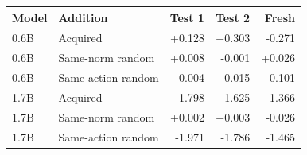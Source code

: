 \begin{tabular}{llrrr}\toprule
Model & Addition & Test 1 & Test 2 & Fresh\\\midrule
0.6B & Acquired & +0.128 & +0.303 & -0.271\\
0.6B & Same-norm random & +0.008 & -0.001 & +0.026\\
0.6B & Same-action random & -0.004 & -0.015 & -0.101\\
1.7B & Acquired & -1.798 & -1.625 & -1.366\\
1.7B & Same-norm random & +0.002 & +0.003 & -0.026\\
1.7B & Same-action random & -1.971 & -1.786 & -1.465\\
\bottomrule\end{tabular}
